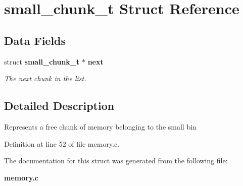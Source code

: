 \section{small\_\-chunk\_\-t Struct Reference}
\label{structsmall__chunk__t}
\subsection*{Data Fields}
\begin{DoxyCompactItemize}
\item 
struct {\bf small\_\-chunk\_\-t} $\ast$ {\bf next}\label{structsmall__chunk__t_acb6c9dc24f1d29f74610678d35efed26}

\begin{DoxyCompactList}\small\item\em The next chunk in the list. \item\end{DoxyCompactList}\end{DoxyCompactItemize}


\subsection{Detailed Description}
Represents a free chunk of memory belonging to the small bin 

Definition at line 52 of file memory.c.



The documentation for this struct was generated from the following file:\begin{DoxyCompactItemize}
\item 
{\bf memory.c}\end{DoxyCompactItemize}
